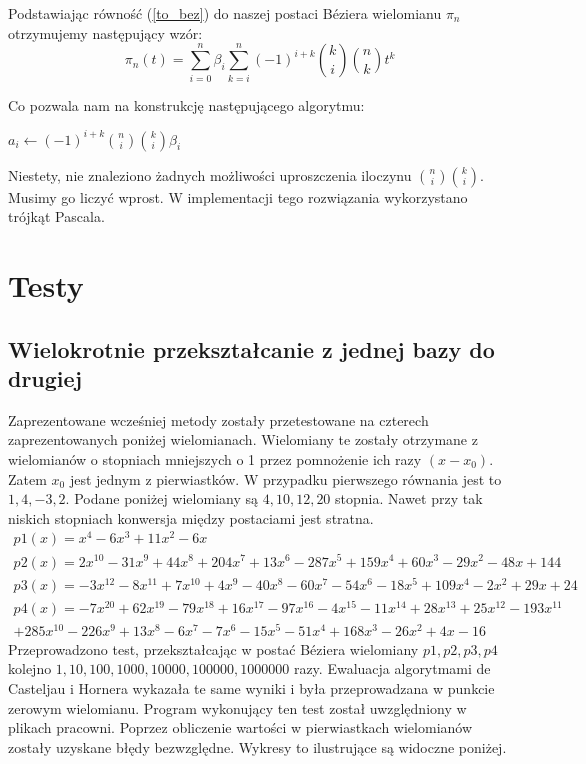 \documentclass[wide, 11pt]{mwart}
\begin{document}
Podstawiając równość (\ref{to_bez}) do naszej postaci Béziera wielomianu 
$\pi_n$ otrzymujemy następujący wzór:
\begin{equation}
  \pi_n(t) = {\sum_{i=0}^n}\beta_i{\sum_{k=i}^n}(-1)^{i+k}
  {k \choose i}{n \choose k}t^k
\end{equation}

Co pozwala nam na konstrukcję następującego algorytmu:
\begin{algorithmic}
      \State $a_i \gets (-1)^{i+k}{n \choose i}{k \choose i}\beta_i$
    \EndFor
  \EndFor
\end{algorithmic}

Niestety, nie znaleziono żadnych możliwości uproszczenia iloczynu 
${n \choose i}{k \choose i}$. Musimy go liczyć wprost. W implementacji tego rozwiązania wykorzystano trójkąt Pascala.

\section{Testy}
\subsection{Wielokrotnie przekształcanie z jednej bazy do drugiej}
Zaprezentowane wcześniej metody zostały przetestowane na czterech zaprezentowanych poniżej wielomianach. Wielomiany te zostały otrzymane z wielomianów o stopniach mniejszych o 1 przez pomnożenie ich razy $(x-x_0)$. Zatem $x_0$ jest jednym z pierwiastków. W przypadku pierwszego równania jest to $1, 4, -3, 2$. Podane poniżej wielomiany są $4, 10, 12, 20$ stopnia. Nawet przy tak niskich stopniach konwersja między postaciami jest stratna. 
\begin{equation}
  \begin{align}
    p1(x) = x^{4} - 6x^{3} + 11x^{2} - 6x\\
    p2(x) = 2x^{10}-31x^{9}+44x^{8}+204x^{7}+13x^{6}-287x^{5}+159x^{4}+60x^{3}-29x^{2}-48x+144\\
    p3(x) = -3x^{12}-8x^{11}+7x^{10}+4x^{9}-40x^{8}-60x^{7}-54x^{6}-18x^{5}+109x^{4}-2x^{2}+29x+24\\
    p4(x) = -7x^{20}+62x^{19}-79x^{18}+16x^{17}-97x^{16}-4x^{15}-11x^{14}+28x^{13}+25x^{12}-193x^{11}\\
    +285x^{10}-226x^{9}+13x^{8}-6x^{7}-7x^{6}-15x^{5}-51x^{4}+168x^{3}-26x^{2}+4x-16
  \end{align}
\end{equation}
Przeprowadzono test, przekształcając w postać Béziera wielomiany $p1,p2,p3,p4$ kolejno $1,10,100,1000,10000,100000,1000000$ razy. Ewaluacja algorytmami de Casteljau i Hornera wykazała te same wyniki i była przeprowadzana w punkcie zerowym wielomianu. Program wykonujący ten test został uwzględniony w plikach pracowni.
Poprzez obliczenie wartości w pierwiastkach wielomianów zostały uzyskane błędy bezwzględne. Wykresy to ilustrujące są widoczne poniżej.
\end{document}
